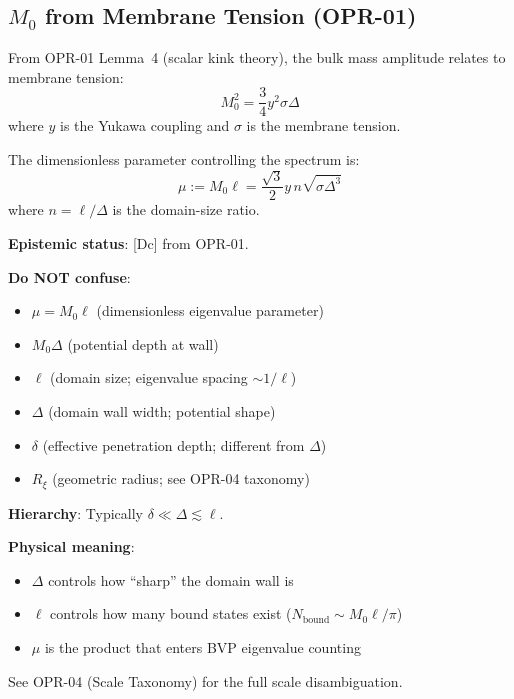 \subsection{$M_0$ from Membrane Tension (OPR-01)}
\label{sec:ch19_m0_anchor}

From OPR-01 Lemma~4 (scalar kink theory), the bulk mass amplitude relates to
membrane tension:
\begin{equation}
    M_0^2 = \frac{3}{4} y^2 \sigma \Delta
    \label{eq:ch19_m0_sigma}
\end{equation}
where $y$ is the Yukawa coupling and $\sigma$ is the membrane tension.

The dimensionless parameter controlling the spectrum is:
\begin{equation}
    \mu := M_0 \ell = \frac{\sqrt{3}}{2} y \, n \sqrt{\sigma \Delta^3}
    \label{eq:ch19_mu_def}
\end{equation}
where $n = \ell/\Delta$ is the domain-size ratio.

\textbf{Epistemic status}: [Dc] from OPR-01.

\begin{tcolorbox}[colback=red!5!white, colframe=red!50!black,
    title=\textbf{Common Pitfall: Scale Disambiguation}]

\textbf{Do NOT confuse}:
\begin{itemize}
    \item $\mu = M_0 \ell$ \quad (dimensionless eigenvalue parameter)
    \item $M_0 \Delta$ \quad (potential depth at wall)
    \item $\ell$ \quad (domain size; eigenvalue spacing $\sim 1/\ell$)
    \item $\Delta$ \quad (domain wall width; potential shape)
    \item $\delta$ \quad (effective penetration depth; different from $\Delta$)
    \item $R_\xi$ \quad (geometric radius; see OPR-04 taxonomy)
\end{itemize}

\textbf{Hierarchy}: Typically $\delta \ll \Delta \lesssim \ell$.

\textbf{Physical meaning}:
\begin{itemize}
    \item $\Delta$ controls how ``sharp'' the domain wall is
    \item $\ell$ controls how many bound states exist ($N_{\text{bound}} \sim M_0 \ell / \pi$)
    \item $\mu$ is the product that enters BVP eigenvalue counting
\end{itemize}

See OPR-04 (Scale Taxonomy) for the full scale disambiguation.

\end{tcolorbox}

